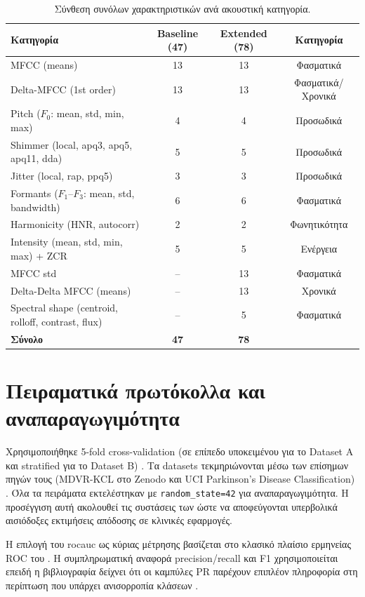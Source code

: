 \begin{table}[H]
\centering
\caption{Σύνθεση συνόλων χαρακτηριστικών ανά ακουστική κατηγορία.}
\label{tab:feature-composition}
\begin{tabular}{@{}lccc@{}}
\toprule
\textbf{Κατηγορία} & \textbf{Baseline (47)} & \textbf{Extended (78)} & \textbf{Κατηγορία} \\
\midrule
MFCC (means) & 13 & 13 & Φασματικά \\
Delta-MFCC (1st order) & 13 & 13 & Φασματικά/Χρονικά \\
Pitch ($F_0$: mean, std, min, max) & 4 & 4 & Προσωδικά \\
Shimmer (local, apq3, apq5, apq11, dda) & 5 & 5 & Προσωδικά \\
Jitter (local, rap, ppq5) & 3 & 3 & Προσωδικά \\
Formants ($F_1$--$F_3$: mean, std, bandwidth) & 6 & 6 & Φασματικά \\
Harmonicity (HNR, autocorr) & 2 & 2 & Φωνητικότητα \\
Intensity (mean, std, min, max) + ZCR & 5 & 5 & Ενέργεια \\
\midrule
MFCC std & -- & 13 & Φασματικά \\
Delta-Delta MFCC (means) & -- & 13 & Χρονικά \\
Spectral shape (centroid, rolloff, contrast, flux) & -- & 5 & Φασματικά \\
\midrule
\textbf{Σύνολο} & \textbf{47} & \textbf{78} & \\
\bottomrule
\end{tabular}
\end{table}

\section{Πειραματικά πρωτόκολλα και αναπαραγωγιμότητα}

Χρησιμοποιήθηκε 5-fold cross-validation (σε επίπεδο υποκειμένου για το Dataset A και stratified για το Dataset B) \citep{bishop2006pattern}. 
Τα datasets τεκμηριώνονται μέσω των επίσημων πηγών τους (MDVR-KCL στο Zenodo και UCI Parkinson's Disease Classification) \citep{mdvr_kcl_2019,uci2018pd_classification}.
Όλα τα πειράματα εκτελέστηκαν με \texttt{random\_state=42} για αναπαραγωγιμότητα. 
Η προσέγγιση αυτή ακολουθεί τις συστάσεις των \citet{ge2023inflation} ώστε να αποφεύγονται υπερβολικά αισιόδοξες εκτιμήσεις απόδοσης σε κλινικές εφαρμογές.

Η επιλογή του \gls{rocauc} ως κύριας μέτρησης βασίζεται στο κλασικό πλαίσιο ερμηνείας ROC του \citet{fawcett2006roc}. 
Η συμπληρωματική αναφορά precision/recall και F1 χρησιμοποιείται επειδή η βιβλιογραφία δείχνει ότι οι καμπύλες PR παρέχουν επιπλέον πληροφορία στη περίπτωση που υπάρχει ανισορροπία κλάσεων \citep{davis2006pr_roc}.

